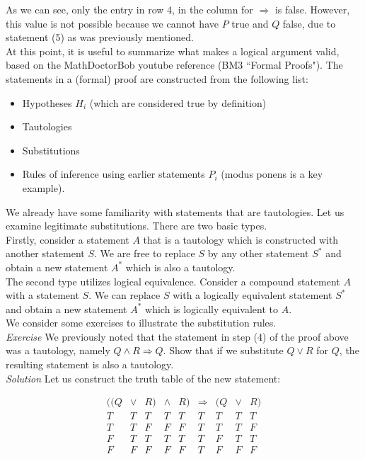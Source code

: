 As we can see, only the entry in row 4, in the column for $\Longrightarrow$ is false.  However, this value is not possible because we cannot have $P$ true and $Q$ false, due to statement (5) as was previously mentioned.\\

At this point, it is useful to summarize what makes a logical argument valid, based on the MathDoctorBob youtube reference (BM3 ``Formal Proofs").  The statements in a (formal) proof are constructed from the following list:\\

\begin{itemize}
\item Hypotheses $H_{i}$ (which are considered true by definition)
\item Tautologies
\item Substitutions
\item Rules of inference using earlier statements $P_{i}$ (modus ponens is a key example).
\end{itemize}

We already have some familiarity with statements that are tautologies.  Let us examine legitimate substitutions.  There are two basic types.\\  

Firstly, consider a statement $A$ that is a tautology which is constructed with another statement $S$.  We are free to replace $S$ by any other statement $S^{*}$ and obtain a new statement $A^{*}$ which is also a tautology.\\

The second type utilizes logical equivalence.  Consider a compound statement $A$ with a statement $S$.  We can replace $S$ with a logically equivalent statement $S^{*}$ and obtain a new statement $A^{*}$ which is logically equivalent to $A$.\\

We consider some exercises to illustrate the substitution rules.\\

\textit{Exercise} We previously noted that the statement in step (4) of the proof above was a tautology, namely $Q \land R \Longrightarrow Q$.  Show that if we substitute $Q \lor R$ for $Q$, the resulting statement is also a tautology.\\

\textit{Solution}  Let us construct the truth table of the new statement:

\begin{displaymath}
\begin{array}{|c|c|c|c|c|c|c|c|c|}
((Q & \lor & R) & \land & R) & \Longrightarrow & (Q & \lor & R) \\
\hline
T & T & T & T & T & T & T & T & T \\
T & T & F & F & F & T & T & T & F \\
F & T & T & T & T & T & F & T & T \\
F & F & F & F & F & T & F & F & F \\
\end{array}
\end{displaymath}

